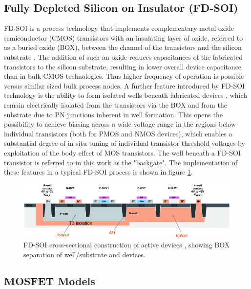 	\subsection{Fully Depleted Silicon on Insulator (FD-SOI)}
	FD-SOI is a process technology that implements complementary metal oxide semiconductor (CMOS) transistors with an insulating layer of oxide, referred to as a buried oxide (BOX), between the channel of the transistors and the silicon substrate \cite{Planes2012}. The addition of such an oxide reduces capacitances of the fabricated transistors to the silicon substrate, resulting in lower overall device capacitance than in bulk CMOS technologies. Thus higher frequency of operation is possible versus similar sized bulk process nodes. A further feature introduced by FD-SOI technology is the ability to form isolated wells beneath fabricated devices \cite{Wiatr2019}, which remain electrically isolated from the transistors via the BOX and from the substrate due to PN junctions inherent in well formation. This opens the possibility to achieve biasing across a wide voltage range in the regions below individual transistors (both for PMOS and NMOS devices), which enables a substantial degree of in-situ tuning of individual transistor threshold voltages by exploitation of the body effect of MOS transistors. The well beneath a FD-SOI transistor is referred to in this work as the "backgate". The implementation of these features in a typical FD-SOI process is shown in figure \ref{fig:22fdx_wells}. 
	
			\begin{figure}[htb!]
			        \centering
			        \includegraphics[width=1\textwidth, angle=0]{./figs/theory/wiatr1-p4-wiatr-large}
			    \caption{FD-SOI cross-sectional construction of active devices \cite{Wiatr2019}, showing BOX separation of well/substrate and devices.}
			    \label{fig:22fdx_wells}
			\end{figure}
	
	\subsection{MOSFET Models}

